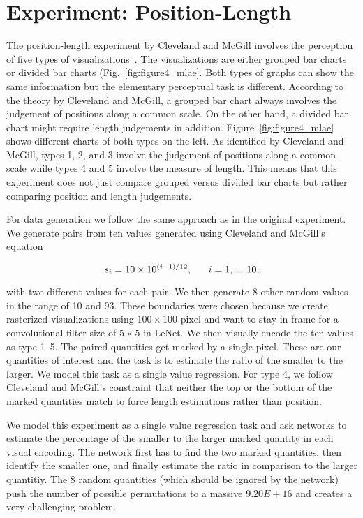 \section{Experiment: Position-Length}

The position-length experiment by Cleveland and McGill involves the perception of five types of visualizations~\cite{cleveland_mcgill}. The visualizations are either grouped bar charts or divided bar charts (Fig.~\ref{fig:figure4_mlae}. Both types of graphs can show the same information but the elementary perceptual task is different. According to the theory by Cleveland and McGill, a grouped bar chart always involves the judgement of positions along a common scale. On the other hand, a divided bar chart might require length judgements in addition. Figure~\ref{fig:figure4_mlae} shows different charts of both types on the left. As identified by Cleveland and McGill, types 1, 2, and 3 involve the judgement of positions along a common scale while types 4 and 5 involve the measure of length. This means that this experiment does not just compare grouped versus divided bar charts but rather comparing position and length judgements.

For data generation we follow the same approach as in the original experiment. We generate pairs from ten values generated using Cleveland and McGill's equation

\begin{equation}
s_i = 10\times10^{(i-1)/12},\textnormal{~~~~~}i=1,...,10,
\end{equation}

with two different values for each pair. We then generate 8 other random values in the range of 10 and 93. These boundaries were chosen because we create rasterized visualizations using $100\times100$ pixel and want to stay in frame for a convolutional filter size of $5\times5$ in LeNet. We then visually encode the ten values as type 1--5. The paired quantities get marked by a single pixel. These are our quantities of interest and the task is to estimate the ratio of the smaller to the larger. We model this task as a single value regression. For type 4, we follow Cleveland and McGill's constraint that neither the top or the bottom of the marked quantities match to force length estimations rather than position.

We model this experiment as a single value regression task and ask networks to estimate the percentage of the smaller to the larger marked quantity in each visual encoding. The network first has to find the two marked quantities, then identify the smaller one, and finally estimate the ratio in comparison to the larger quantitiy. The 8 random quantities (which should be ignored by the network) push the number of possible permutations to a massive $9.20E+16$ and creates a very challenging problem.


